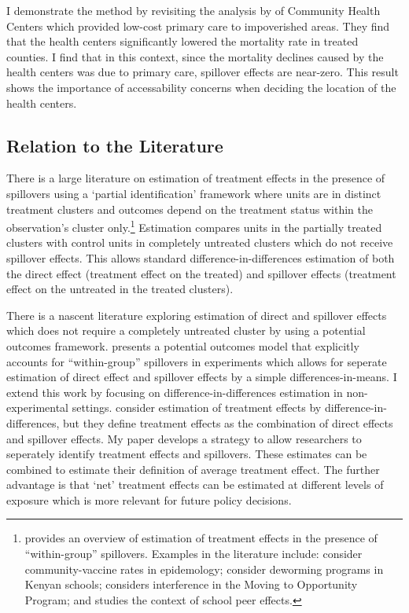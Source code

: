 \documentclass[11pt]{article}
\begin{document}
I demonstrate the method by revisiting the analysis by \citet{Bailey_Goodman_Bacon_2015} of Community Health Centers which provided low-cost primary care to impoverished areas. They find that the health centers significantly lowered the mortality rate in treated counties. I find that in this context, since the mortality declines caused by the health centers was due to primary care, spillover effects are near-zero. This result shows the importance of accessability concerns when deciding the location of the health centers.

\subsection{Relation to the Literature} 

There is a large literature on estimation of treatment effects in the presence of spillovers using a `partial identification' framework where units are in distinct treatment clusters and outcomes depend on the treatment status within the observation's cluster only.\footnote{ \citet{Angelucci_DiMaro_2016} provides an overview of estimation of treatment effects in the presence of ``within-group'' spillovers. Examples in the literature include: \citet{Halloran_Struchiner_1995} consider community-vaccine rates in epidemology; \citet{Miguel_Kremer_2004} consider deworming programs in Kenyan schools; \citet{Sobel_2006} considers interference in the Moving to Opportunity Program; and \citet{Angrist_2014} studies the context of school peer effects.} Estimation compares units in the partially treated clusters with control units in completely untreated clusters which do not receive spillover effects. This allows standard difference-in-differences estimation of both the direct effect (treatment effect on the treated) and spillover effects (treatment effect on the untreated in the treated clusters). 

There is a nascent literature exploring estimation of direct and spillover effects which does not require a completely untreated cluster by using a potential outcomes framework. \citet{Vazquez-Bare_2019} presents a potential outcomes model that explicitly accounts for ``within-group'' spillovers in experiments which allows for seperate estimation of direct effect and spillover effects by a simple differences-in-means. I extend this work by focusing on difference-in-differences estimation in non-experimental settings.  \citet{Sävje_Aronow_Hudgens_2019} consider estimation of treatment effects by difference-in-differences, but they define treatment effects as the combination of direct effects and spillover effects. My paper develops a strategy to allow researchers to seperately identify treatment effects and spillovers. These estimates can be combined to estimate their definition of average treatment effect. The further advantage is that `net' treatment effects can be estimated at different levels of exposure which is more relevant for future policy decisions.
\end{document}
